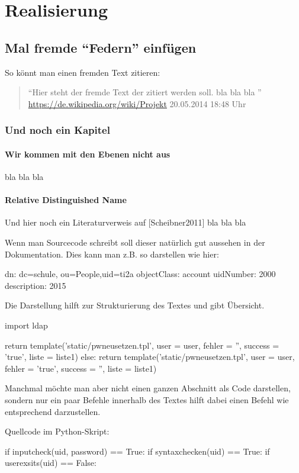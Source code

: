 \newpage
\section{Realisierung}
\subsection{Mal fremde ``Federn'' einfügen}
So könnt man einen fremden Text zitieren:
\begin{quote}
``Hier steht der fremde Text der zitiert werden soll. bla bla bla ''
\newline
\url{https://de.wikipedia.org/wiki/Projekt} 20.05.2014 18:48 Uhr
\end{quote}
\subsubsection{Und noch ein Kapitel}
\paragraph{Wir kommen mit den Ebenen nicht aus}$\;$\\
bla bla bla 
\paragraph{Relative Distinguished Name}$\;$\\
Und hier noch ein Literaturverweis auf [Scheibner2011]
bla bla bla 

Wenn man Sourcecode schreibt soll dieser natürlich gut aussehen in der Dokumentation. Dies kann man z.B. so 
darstellen wie hier:
\begin{python}
dn: dc=schule, ou=People,uid=ti2a
objectClass: account
uidNumber: 2000
description: 2015
\end{python}

Die Darstellung hilft zur Strukturierung des Textes und gibt Übersicht.
\begin{python}
import ldap
\end{python}

\begin{python}
return template('static/pwneusetzen.tpl', user = user, 
			fehler = '', success = 'true',
			liste = liste1)
else:
	return template('static/pwneusetzen.tpl', 
	user = user, fehler = 'true', 
	success = '', liste = liste1)
\end{python}

Manchmal möchte man aber nicht einen ganzen Abschnitt als Code darstellen, sondern nur ein paar Befehle 
innerhalb des Textes  hilft dabei einen Befehl wie  
entsprechend darzustellen.

Quellcode im Python-Skript:
\begin{python}
if inputcheck(uid, password) == True:
	if syntaxchecken(uid) == True:
		if userexsits(uid) == False:
\end{python}


